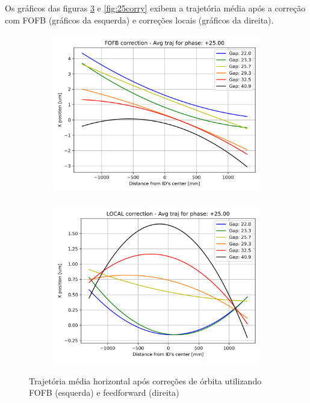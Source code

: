 \documentclass[a4paper,12pt]{article}
\begin{document}
Os gráficos das figuras \ref{fig:25corrx} e \ref{fig:25corry} exibem a trajetória média após a correção com FOFB (gráficos da esquerda) e correções locais (gráficos da direita).

\begin{figure}[H]
\begin{subfigure}{0.5\textwidth}
\includegraphics[width=0.9\linewidth, height=7cm]{figs/phase25 horizontal-avg-traj-FOFB.png} 
\label{fig:subim10xc25}
\end{subfigure}
\begin{subfigure}{0.5\textwidth}
\includegraphics[width=0.9\linewidth, height=7cm]{figs/phase25 horizontal-avg-traj-LOCAL.png}
\label{fig:subim20xc25}
\end{subfigure}
\caption{Trajetória média horizontal após correções de órbita utilizando FOFB (esquerda) e feedforward (direita)}
\label{fig:25corrx}
\end{figure}
\end{document}
